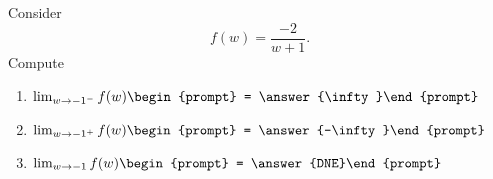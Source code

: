 \documentclass{ximera}
\author{Bart Snapp}
\begin{document}
\begin{exercise}
Consider 
\[
f(w) = \frac{-2}{w+1}.
\]
Compute
\begin{enumerate}
\item $\lim_{w\to -1^- } f(w) \begin{prompt} = \answer{\infty}\end{prompt}$
\item $\lim_{w\to -1^+ } f(w) \begin{prompt} = \answer{-\infty}\end{prompt}$
\item $\lim_{w\to -1 } f(w) \begin{prompt} = \answer{DNE}\end{prompt}$
\end{enumerate}
\end{exercise}
\end{document}
